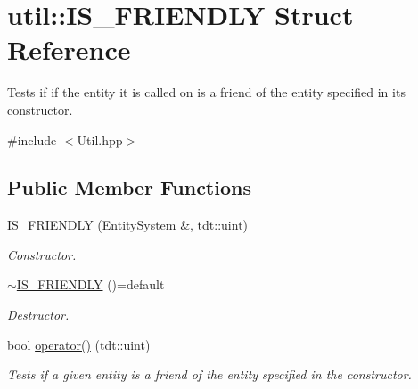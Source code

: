 \hypertarget{structutil_1_1_i_s___f_r_i_e_n_d_l_y}{}\section{util\+:\+:I\+S\+\_\+\+F\+R\+I\+E\+N\+D\+LY Struct Reference}
\label{structutil_1_1_i_s___f_r_i_e_n_d_l_y}


Tests if if the entity it is called on is a friend of the entity specified in it\textquotesingle{}s constructor.  




{\ttfamily \#include $<$Util.\+hpp$>$}

\subsection*{Public Member Functions}
\begin{DoxyCompactItemize}
\item 
\hyperlink{structutil_1_1_i_s___f_r_i_e_n_d_l_y_a76ee22e656a09e22404d928e952396b2}{I\+S\+\_\+\+F\+R\+I\+E\+N\+D\+LY} (\hyperlink{class_entity_system}{Entity\+System} \&, tdt\+::uint)
\begin{DoxyCompactList}\small\item\em Constructor. \end{DoxyCompactList}\item 
\hyperlink{structutil_1_1_i_s___f_r_i_e_n_d_l_y_abaea84eb112f36c9730fbe5e172cc8c1}{$\sim$\+I\+S\+\_\+\+F\+R\+I\+E\+N\+D\+LY} ()=default
\begin{DoxyCompactList}\small\item\em Destructor. \end{DoxyCompactList}\item 
bool \hyperlink{structutil_1_1_i_s___f_r_i_e_n_d_l_y_a82a8f69856196037f1d8b2287c761037}{operator()} (tdt\+::uint)
\begin{DoxyCompactList}\small\item\em Tests if a given entity is a friend of the entity specified in the constructor. \end{DoxyCompactList}\end{DoxyCompactItemize}
